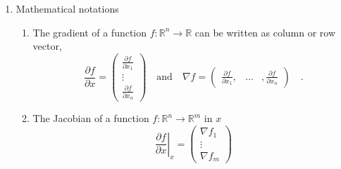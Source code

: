 \begin{enumerate}
\item Mathematical notations
	\begin{enumerate}
	\item The gradient of a function $f:\mathbb{R}^n\to\mathbb{R}$ can be written as column 
	or row vector,
		\begin{equation}
			\frac{\partial f}{\partial x} = \begin{pmatrix}
			\frac{\partial f}{\partial x_1} \\ \vdots \\ \frac{\partial f}{\partial x_n} 
			\end{pmatrix} \quad \text{and} \quad \nabla f = 
			 \begin{pmatrix}
			\frac{\partial f}{\partial x_1}, & \hdots &, \frac{\partial f}{\partial x_n}  
			\end{pmatrix}  \quad .
		\end{equation}
	\item The Jacobian of a function $f:\mathbb{R}^n \to \mathbb{R}^m$ in $x$
		\begin{equation}
		\left. \frac{\partial f}{\partial x} \right|_{x} = \begin{pmatrix}
		\nabla f_1 \\ \vdots \\ \nabla f_m
		\end{pmatrix}		 
		\end{equation}
	\end{enumerate}

\end{enumerate}


